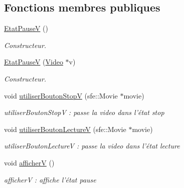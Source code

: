 \subsection*{Fonctions membres publiques}
\begin{DoxyCompactItemize}
\item 
\hypertarget{classEtatPauseV_adc71aed982aab87ac55763db51b5a7d6}{\hyperlink{classEtatPauseV_adc71aed982aab87ac55763db51b5a7d6}{Etat\+Pause\+V} ()}\label{classEtatPauseV_adc71aed982aab87ac55763db51b5a7d6}

\begin{DoxyCompactList}\small\item\em Constructeur. \end{DoxyCompactList}\item 
\hyperlink{classEtatPauseV_aa8eab25d136fd125b0c7bb4307fd1b6e}{Etat\+Pause\+V} (\hyperlink{classVideo}{Video} $\ast$v)
\begin{DoxyCompactList}\small\item\em Constructeur. \end{DoxyCompactList}\item 
\hypertarget{classEtatPauseV_aa54762c0a9beb8a480328e496427f87e}{void \hyperlink{classEtatPauseV_aa54762c0a9beb8a480328e496427f87e}{utiliser\+Bouton\+Stop\+V} (sfe\+::\+Movie $\ast$movie)}\label{classEtatPauseV_aa54762c0a9beb8a480328e496427f87e}

\begin{DoxyCompactList}\small\item\em utiliser\+Bouton\+Stop\+V \+: passe la video dans l'état stop \end{DoxyCompactList}\item 
\hypertarget{classEtatPauseV_a31eab025c73198ba4659d007ee74e3ef}{void \hyperlink{classEtatPauseV_a31eab025c73198ba4659d007ee74e3ef}{utiliser\+Bouton\+Lecture\+V} (sfe\+::\+Movie $\ast$movie)}\label{classEtatPauseV_a31eab025c73198ba4659d007ee74e3ef}

\begin{DoxyCompactList}\small\item\em utiliser\+Bouton\+Lecture\+V \+: passe la video dans l'état lecture \end{DoxyCompactList}\item 
\hypertarget{classEtatPauseV_ac73e8e3bd58cdf51e143e5a8181fabc8}{void \hyperlink{classEtatPauseV_ac73e8e3bd58cdf51e143e5a8181fabc8}{afficher\+V} ()}\label{classEtatPauseV_ac73e8e3bd58cdf51e143e5a8181fabc8}

\begin{DoxyCompactList}\small\item\em afficher\+V \+: affiche l'état pause \end{DoxyCompactList}\end{DoxyCompactItemize}


